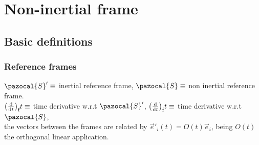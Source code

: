 \section{Non-inertial frame}



\subsection{Basic definitions}



\subsubsection*{Reference frames}
$\pazocal{S}'\equiv$ inertial reference frame, $\pazocal{S}\equiv$ non inertial reference frame.\\
$\qty(\dv{}{t})_{\text{f}}{t}\equiv$ time derivative w.r.t $\pazocal{S}'$, $\qty(\dv{}{t})_{\text{f}}{t}\equiv$ time derivative w.r.t $\pazocal{S}$,\\
the vectors between the frames are related by $\vec{e}'_{i}(t)=O(t)\vec{e}_{i}$, being $O(t)$ the orthogonal linear application.



